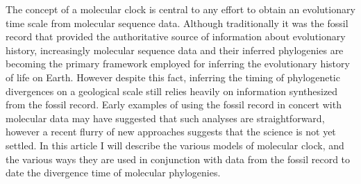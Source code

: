 The concept of a molecular clock is central to any effort to obtain an evolutionary time scale from molecular sequence data.
Although traditionally it was the fossil record that provided the authoritative source of information about evolutionary history, increasingly molecular sequence data and their inferred phylogenies are becoming the primary framework employed for inferring the evolutionary history of life on Earth. However despite this fact, inferring the timing of phylogenetic divergences on a geological scale still relies heavily on information synthesized from the fossil record. Early examples of using the fossil record in concert with molecular data may have suggested that such analyses are straightforward, however a recent flurry of new approaches suggests that the science is not yet settled. In this article I will describe the various models of molecular clock, and the various ways they are used in conjunction with data from the fossil record to date the divergence time of molecular phylogenies.
  